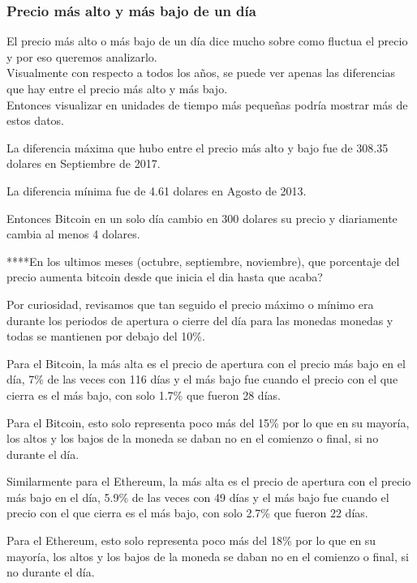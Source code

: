 \documentclass[12pt,letterpaper]{article}
\begin{document}
    \subsubsection*{Precio más alto y más bajo de un día}

    El precio m\'as alto o m\'as bajo de un d\'ia dice mucho sobre como fluctua el precio y por eso queremos analizarlo.
    \\

    Visualmente con respecto a todos los a\~nos, se puede ver apenas las diferencias que hay entre el precio m\'as alto y m\'as bajo.
    \\


    Entonces visualizar en unidades de tiempo m\'as peque\~nas podr\'ia mostrar m\'as de estos datos.

    La diferencia m\'axima que hubo entre el precio m\'as alto y bajo fue de 308.35 dolares en Septiembre de 2017.

    La diferencia m\'inima fue de 4.61 dolares en Agosto de 2013.

    Entonces Bitcoin en un solo d\'ia cambio en 300 dolares su precio y diariamente cambia al menos 4 dolares.


    ****En los ultimos meses (octubre, septiembre, noviembre), que porcentaje del precio aumenta bitcoin desde que inicia el dia hasta que acaba?
    

    Por curiosidad, revisamos que tan seguido el precio máximo o mínimo era durante los periodos de apertura o cierre del día para las monedas monedas y todas se mantienen por debajo del 10\%.

    Para el Bitcoin, la más alta es el precio de apertura con el precio más bajo en el día, 7\% de las veces con 116 días y el más bajo fue cuando el precio con el que cierra es el más bajo, con solo 1.7\% que fueron 28 días.

    Para el Bitcoin, esto solo representa poco más del 15\% por lo que en su mayoría, los altos y los bajos de la moneda se daban no en el comienzo o final, si no durante el día.



    Similarmente para el Ethereum, la más alta es el precio de apertura con el precio más bajo en el día, 5.9\% de las veces con 49 días y el más bajo fue cuando el precio con el que cierra es el más bajo, con solo 2.7\% que fueron 22 días.

    Para el Ethereum, esto solo representa poco más del 18\% por lo que en su mayoría, los altos y los bajos de la moneda se daban no en el comienzo o final, si no durante el día.
\end{document}

